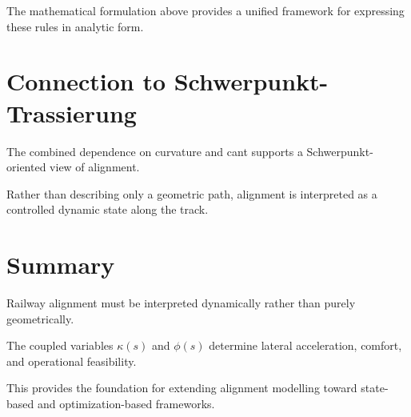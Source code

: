 \begin{remark}
The mathematical formulation above provides a unified framework for
expressing these rules in analytic form.
\end{remark}

\section{Connection to Schwerpunkt-Trassierung}

\begin{remark}
The combined dependence on curvature and cant supports a
Schwerpunkt-oriented view of alignment.
\end{remark}

\begin{remark}
Rather than describing only a geometric path, alignment is interpreted as
a controlled dynamic state along the track.
\end{remark}

\section{Summary}

\begin{summary}
Railway alignment must be interpreted dynamically rather than purely
geometrically.

The coupled variables $\kappa(s)$ and $\phi(s)$ determine lateral
acceleration, comfort, and operational feasibility.

This provides the foundation for extending alignment modelling toward
state-based and optimization-based frameworks.
\end{summary}
